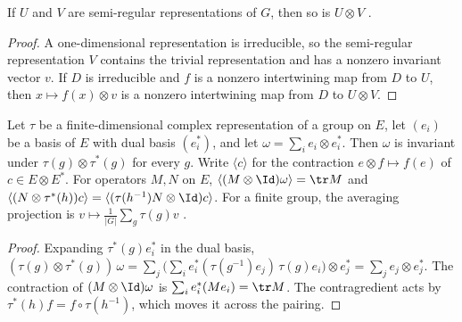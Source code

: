 \begin{lemma}%
    \label{thm:peps_semiregular_tensor_product}
    \leanok
    If $U$ and $V$ are semi-regular representations of $G$, then so is
    $U\otimes V$ \cite[proof of Lemma~5.2]{Schuch2010PEPS}.
\end{lemma}

\begin{proof}\leanok
    A one-dimensional representation is irreducible, so the semi-regular
    representation $V$ contains the trivial representation and has a nonzero
    invariant vector $v$. If $D$ is irreducible and $f$ is a nonzero
    intertwining map from $D$ to $U$, then $x\mapsto f(x)\otimes v$ is a
    nonzero intertwining map from $D$ to $U\otimes V$.
\end{proof}

\begin{lemma}%
    \label{thm:characters_coevaluation_invariance}
    \leanok
    Let $\tau$ be a finite-dimensional complex representation of a group on
    $E$, let $(e_i)$ be a basis of $E$ with dual basis $(e_i^*)$, and let
    $\omega=\sum_ie_i\otimes e_i^*$. Then $\omega$ is invariant under
    $\tau(g)\otimes\tau^*(g)$ for every $g$. Write $\langle c\rangle$ for the
    contraction $e\otimes f\mapsto f(e)$ of $c\in E\otimes E^*$. For operators
    $M,N$ on $E$, $\langle(M\otimes\Id)\omega\rangle=\tr M$ and
    $\langle(N\otimes\tau^*(h))c\rangle=\langle(\tau(h^{-1})N\otimes\Id)c\rangle$. For a finite group, the averaging
    projection is $v\mapsto\frac{1}{|G|}\sum_g\tau(g)v$
    \cite[proof of Lemma~5.2]{Schuch2010PEPS}.
\end{lemma}

\begin{proof}\leanok
    Expanding $\tau^*(g)e_i^*$ in the dual basis,
    $(\tau(g)\otimes\tau^*(g))\,\omega
        =\sum_j\big(\sum_ie_i^*(\tau(g^{-1})e_j)\,\tau(g)e_i\big)\otimes e_j^*
        =\sum_je_j\otimes e_j^*$. The contraction of $(M\otimes\Id)\omega$ is
    $\sum_ie_i^*(Me_i)=\tr M$. The contragredient acts by
    $\tau^*(h)f=f\circ\tau(h^{-1})$, which moves it across the pairing.
\end{proof}
